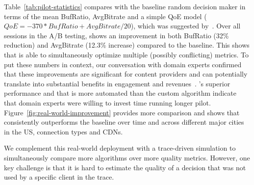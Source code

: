 Table~\ref{tab:pilot-statistics} compares \dda with the 
baseline random decision maker in terms of the mean 
BufRatio, AvgBitrate
and a simple QoE model 
($QoE=-370*BufRatio+AvgBitrate/20$), which was 
suggested by~\cite{sigcomm12conviva,sigcomm11}. 
Over all sessions in the A/B testing, \dda shows an 
improvement in both BufRatio (32\% reduction) and 
AvgBitrate (12.3\% increase) compared to the baseline.
This shows that \dda is able to simultaneously optimize
multiple (possibly conflicting) metrics. 
To put these numbers in context, our conversation 
with domain experts  confirmed that these 
improvements are significant for content providers and 
 can potentially translate into  substantial benefits in 
 engagement and revenues~\cite{convivapersonal}.
\dda's superior performance and that  \dda is more 
automated than the custom algorithm indicate that 
domain experts were willing to invest time running 
longer pilot.
Figure~\ref{fig:real-world-improvement} provides 
more comparison and shows that \dda consistently 
outperforms the baseline over time and across different 
major cities in the US, connection types and CDNs. 




We complement this real-world deployment with a 
trace-driven simulation to simultaneously compare 
more algorithms over more quality metrics. 
However, one key challenge is that it is hard to 
estimate the quality of a decision that was not used 
by a specific client in the trace.

